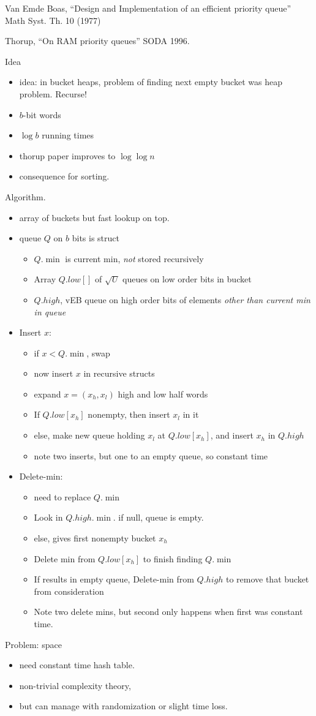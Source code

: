 \documentclass{article}
\begin{document}
Van Emde Boas, ``Design and Implementation of an efficient priority
queue'' Math Syst. Th. 10 (1977)

Thorup, ``On RAM priority queues'' SODA 1996.

Idea
\begin{itemize}
\item idea: in bucket heaps, problem of finding next empty bucket was
  heap problem.  Recurse!
\item $b$-bit words
\item $\log b$ running times
\item thorup paper improves to $\log\log n$
\item consequence for sorting.
\end{itemize}



Algorithm.  
\begin{itemize}
\item array of buckets but fast lookup on top.
\item queue $Q$ on $b$ bits is struct
  \begin{itemize}
  \item $Q.\min$ is current min, \emph{not} stored recursively
  \item Array $Q.low[]$ of $\sqrt{U}$ queues on low order bits in bucket
  \item $Q.high$, vEB queue on high order bits of elements \emph{other than
    current min in queue}
  \end{itemize}
\item Insert $x$:
  \begin{itemize}
  \item if $x < Q.\min$, swap
  \item now insert $x$ in recursive structs
  \item expand $x=(x_h,x_l)$ high and low half words
  \item If $Q.low[x_h]$ nonempty, then insert $x_l$ in it
  \item else, make new queue holding $x_l$ at $Q.low[x_h]$, and insert
    $x_h$ in $Q.high$
  \item note two inserts, but one to an empty queue, so constant time
  \end{itemize}
\item Delete-min:
  \begin{itemize}
  \item need to replace $Q.\min$
  \item Look in $Q.high.\min$.  if null, queue is empty.  
  \item else, gives first nonempty bucket $x_h$
  \item Delete min from $Q.low[x_h]$ to finish finding $Q.\min$
  \item If results in empty queue, Delete-min from $Q.high$ to remove
    that bucket from consideration
  \item Note two delete mins, but second only happens when first was
    constant time.
  \end{itemize}
\end{itemize}

Problem: space
\begin{itemize}
\item need constant time hash table.  
\item non-trivial complexity theory,
\item but can manage with randomization or slight time loss.
\end{itemize}
\end{document}
